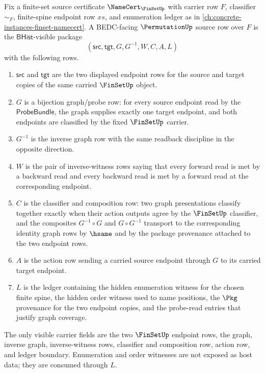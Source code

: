 \begin{definition}
\label{def:permutation-bijection-source-row}
Fix a finite-set source certificate $\NameCert_{\FinSetUp}$ with carrier row $F$, classifier $\sim_F$, finite-spine endpoint row $xs$, and enumeration ledger as in \autoref{ch:concrete-instances-finset-namecert}. A BEDC-facing $\PermutationUp$ source row over $F$ is the $\mathsf{BHist}$-visible package
$$
(\mathsf{src},\mathsf{tgt},G,G^{-1},W,C,A,L)
$$
with the following rows.
\begin{enumerate}
\item $\mathsf{src}$ and $\mathsf{tgt}$ are the two displayed endpoint rows for the source and target copies of the same carried $\FinSetUp$ object.
\item $G$ is a bijection graph/probe row: for every source endpoint read by the $\mathsf{ProbeBundle}$, the graph supplies exactly one target endpoint, and both endpoints are classified by the fixed $\FinSetUp$ carrier.
\item $G^{-1}$ is the inverse graph row with the same readback discipline in the opposite direction.
\item $W$ is the pair of inverse-witness rows saying that every forward read is met by a backward read and every backward read is met by a forward read at the corresponding endpoint.
\item $C$ is the classifier and composition row: two graph presentations classify together exactly when their action outputs agree by the $\FinSetUp$ classifier, and the composites $G^{-1}\circ G$ and $G\circ G^{-1}$ transport to the corresponding identity graph rows by $\hsame$ and by the package provenance attached to the two endpoint rows.
\item $A$ is the action row sending a carried source endpoint through $G$ to its carried target endpoint.
\item $L$ is the ledger containing the hidden enumeration witness for the chosen finite spine, the hidden order witness used to name positions, the $\Pkg$ provenance for the two endpoint copies, and the probe-read entries that justify graph coverage.
\end{enumerate}
The only visible carrier fields are the two $\FinSetUp$ endpoint rows, the graph, inverse graph, inverse-witness rows, classifier and composition row, action row, and ledger boundary. Enumeration and order witnesses are not exposed as host data; they are consumed through $L$.
\end{definition}

